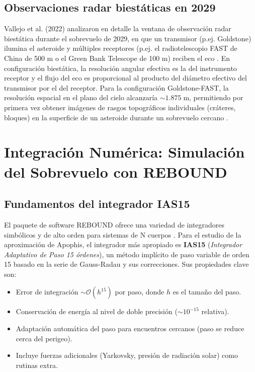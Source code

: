 \documentclass[a4paper]{article}
\begin{document}
\subsection{Observaciones radar biestáticas en 2029}

Vallejo et al. (2022) analizaron en detalle la ventana de observación radar biestática durante el sobrevuelo de 2029, en que un transmisor (p.ej. Goldstone) ilumina el asteroide y múltiples receptores (p.ej. el radiotelescopio FAST de China de 500 m o el Green Bank Telescope de 100 m) reciben el eco \cite{vallejo2022conditions}. En configuración biestática, la resolución angular efectiva es la del instrumento receptor y el flujo del eco es proporcional al producto del diámetro efectivo del transmisor por el del receptor. Para la configuración Goldstone-FAST, la resolución espacial en el plano del cielo alcanzaría $\sim 1.875\;\text{m}$, permitiendo por primera vez obtener imágenes de rasgos topográficos individuales (cráteres, bloques) en la superficie de un asteroide durante un sobrevuelo cercano \cite{vallejo2022conditions, nasa2025apophisfacts}.

\section{Integración Numérica: Simulación del Sobrevuelo con REBOUND}

\subsection{Fundamentos del integrador IAS15}

El paquete de software \textsc{REBOUND} ofrece una variedad de integradores simbólicos y de alto orden para sistemas de N cuerpos \cite{rein2012rebound}. Para el estudio de la aproximación de Apophis, el integrador más apropiado es \textbf{IAS15} (\textit{Integrador Adaptativo de Paso 15 órdenes}), un método implícito de paso variable de orden 15 basado en la serie de Gauss-Radau y sus correcciones. Sus propiedades clave son:

\begin{itemize}
  \item Error de integración $\sim \mathcal{O}(h^{15})$ por paso, donde $h$ es el tamaño del paso.
  \item Conservación de energía al nivel de doble precisión ($\sim 10^{-15}$ relativa).
  \item Adaptación automática del paso para encuentros cercanos (paso se reduce cerca del perigeo).
  \item Incluye fuerzas adicionales (Yarkovsky, presión de radiación solar) como rutinas extra.
\end{itemize}
\end{document}

